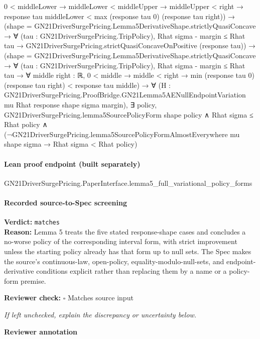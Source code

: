 \documentclass[10pt]{article}
\newcommand{\reviewerbox}{%
  \par\noindent\fbox{\parbox{0.96\linewidth}{\rule{0pt}{0.38in}}}\par
}
\newcommand{\reviewmatch}[1]{%
  \par\noindent\textbf{Reviewer check:} $\square$\; #1\par
  \noindent\emph{If left unchecked, explain the discrepancy or uncertainty below.}\par
}
\begin{document}
\begin{ReviewVerbatim}
                                  0 < middleLower →
                                    middleLower < middleUpper →
                                      middleUpper < right →
                                        response tau middleLower < max (response tau 0) (response tau right)) →
                          (shape = GN21DriverSurgePricing.Lemma5DerivativeShape.strictlyQuasiConcave →
                              ∀ (tau : GN21DriverSurgePricing.TripPolicy),
                                Rhat sigma - margin ≤ Rhat tau →
                                  GN21DriverSurgePricing.strictQuasiConcaveOnPositive (response tau)) →
                            (shape = GN21DriverSurgePricing.Lemma5DerivativeShape.strictlyQuasiConcave →
                                ∀ (tau : GN21DriverSurgePricing.TripPolicy),
                                  Rhat sigma - margin ≤ Rhat tau →
                                    ∀ {middle right : ℝ},
                                      0 < middle →
                                        middle < right →
                                          min (response tau 0) (response tau right) < response tau middle) →
                              ∀
                                (H :
                                  GN21DriverSurgePricing.ProofBridge.GN21Lemma5AENullEndpointVariation mu Rhat response
                                    shape sigma margin),
                                ∃ policy,
                                  GN21DriverSurgePricing.lemma5SourcePolicyForm shape policy ∧
                                    Rhat sigma ≤ Rhat policy ∧
                                      (¬GN21DriverSurgePricing.lemma5SourcePolicyFormAlmostEverywhere mu shape sigma →
                                        Rhat sigma < Rhat policy)
\end{ReviewVerbatim}

\paragraph{Lean proof endpoint (built separately)}\begin{ReviewVerbatim}
GN21DriverSurgePricing.PaperInterface.lemma5_full_variational_policy_forms
\end{ReviewVerbatim}

\paragraph{Recorded source-to-Spec screening}
\textbf{Verdict:} \texttt{matches}
\\
\textbf{Reason:} Lemma 5 treats the five stated response-shape cases and concludes a no-worse policy of the corresponding interval form, with strict improvement unless the starting policy already has that form up to null sets. The Spec makes the source's continuous-law, open-policy, equality-modulo-null-sets, and endpoint-derivative conditions explicit rather than replacing them by a name or a policy-form premise.
\reviewmatch{Matches source input}
\noindent\textbf{Reviewer annotation}\par
\reviewerbox
\clearpage
\hypertarget{source-claim-c17cbc11714a18c6}{}
\hypertarget{source-section-9912151b1a19081b}{}
\end{document}
